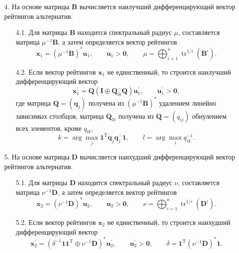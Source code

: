 \documentclass[specialist,
substylefile = spbu.rtx,
               subf,href,colorlinks=true, 12pt]{disser}
\begin{document}
\begin{itemize}
        
        \item[4.]
        На основе матрицы $\bm{B}$ вычисляется наилучший дифференцирующий вектор рейтингов альтернатив.
        \begin{itemize}
            \item[4.1.]
            Для матрицы $\bm{B}$ находится спектральный радиус $\mu$, составляется матрица $\mu^{-1}\bm{B}$, а затем определяется вектор рейтингов
            $$
            \bm{x}_{1} = (\mu^{-1}\bm{B})^{\ast}\bm{u}_{1},
            \qquad
            \bm{u}_{1} > \bm{0},
            \qquad
            \mu = \bigoplus_{i=1}^{n}{\mathop\mathrm{tr}}^{1/i}(\bm{B}^{i}).
            $$
            \item[4.2.]
            Если вектор рейтингов $\bm{x}_{1}$ не единственный, то строится наилучший дифференцирующий вектор
            $$
            \bm{x}_{1}^{\prime} =
            \bm{Q}(\bm{I}\oplus\bm{Q}_{lk}^{-}\bm{Q})
            \bm{u}_{1}^{\prime},
            \qquad
            \bm{u}_{1}^{\prime} > \bm{0},
            $$
            где матрица $\bm{Q}=(\bm{q}_{j})$ получена из $(\mu^{-1}\bm{B})^{\ast}$ удалением линейно зависимых столбцов, матрица $\bm{Q}_{lk}$ получена из $\bm{Q}=(q_{ij})$ обнулением всех элементов, кроме $q_{lk}$, 
            $$
            k = \arg\max_{j}\bm{1}^{\mathrm{T}}\bm{q}_{j}\bm{q}_{j}^{-}\bm{1},
            \qquad
            l = \arg\max_{i}q_{ik}^{-1}.
            $$
        \end{itemize}
        \item[5.]
        На основе матрицы $\bm{D}$ вычисляется наихудший дифференцирующий вектор рейтингов альтернатив.
        \begin{itemize}
            \item[5.1.]
            Для матрицы $\bm{D}$ находится спектральный радиус $\nu$, составляется матрица $\nu^{-1}\bm{D}$, а затем определяется вектор рейтингов
            $$
            \bm{x}_{2} =
            (\nu^{-1}\bm{D})^{\ast}\bm{u}_{2},
            \qquad
            \bm{u}_{2} > \bm{0},
            \qquad
            \nu
            =
            \bigoplus_{i=1}^{n}{\mathop\mathrm{tr}}^{1/i}(\bm{D}^{i}).
            $$
            \item[5.2.]
            Если вектор рейтингов $\bm{x}_{2}$ не единственный, то строится наихудший дифференцирующий вектор
            $$
            \bm{x}_{2}^{\prime} =
            (\delta^{-1}\bm{1}\bm{1}^{\mathrm{T}}\oplus\nu^{-1}\bm{D})^{\ast}
            \bm{u}_{2}^{\prime},
            \qquad
            \bm{u}_{2}^{\prime} > \bm{0},
            \qquad
            \delta =
            \bm{1}^{\mathrm{T}}(\nu^{-1}\bm{D})^{\ast}\bm{1}.
            $$
        \end{itemize}
        
    \end{itemize}
\end{document}
